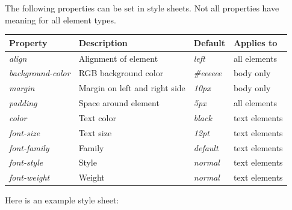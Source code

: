 \documentclass[letterpaper,10pt,english]{sphinxmanual}
\begin{document}
The following properties can be set in style sheets. Not all properties have
meaning for all element types.

\begin{tabulary}{\linewidth}{|L|L|L|L|}
\hline
\textbf{
Property
} & \textbf{
Description
} & \textbf{
Default
} & \textbf{
Applies to
}\\\hline

\emph{align}
 & 
Alignment of element
 & 
\emph{left}
 & 
all elements
\\\hline

\emph{background-color}
 & 
RGB background color
 & 
\emph{\#eeeeee}
 & 
body only
\\\hline

\emph{margin}
 & 
Margin on left and right side
 & 
\emph{10px}
 & 
body only
\\\hline

\emph{padding}
 & 
Space around element
 & 
\emph{5px}
 & 
all elements
\\\hline

\emph{color}
 & 
Text color
 & 
\emph{black}
 & 
text elements
\\\hline

\emph{font-size}
 & 
Text size
 & 
\emph{12pt}
 & 
text elements
\\\hline

\emph{font-family}
 & 
Family
 & 
\emph{default}
 & 
text elements
\\\hline

\emph{font-style}
 & 
Style
 & 
\emph{normal}
 & 
text elements
\\\hline

\emph{font-weight}
 & 
Weight
 & 
\emph{normal}
 & 
text elements
\\\hline
\end{tabulary}


Here is an example style sheet:
\end{document}
